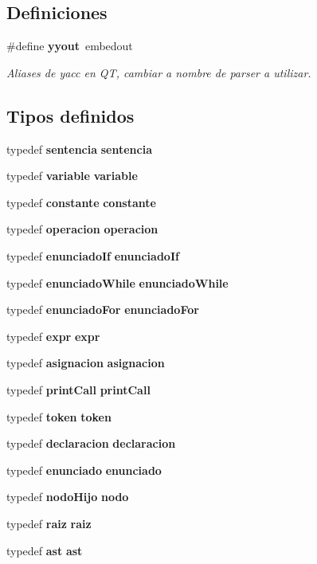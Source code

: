 \subsection*{Definiciones}
\begin{CompactItemize}
\item 
\#define {\bf yyout}~embedout
\begin{CompactList}\small\item\em Aliases de yacc en QT, cambiar a nombre de parser a utilizar. \item\end{CompactList}\end{CompactItemize}
\subsection*{Tipos definidos}
\begin{CompactItemize}
\item 
typedef {\bf sentencia} {\bf sentencia}
\item 
typedef {\bf variable} {\bf variable}
\item 
typedef {\bf constante} {\bf constante}
\item 
typedef {\bf operacion} {\bf operacion}
\item 
typedef {\bf enunciado\-If} {\bf enunciado\-If}
\item 
typedef {\bf enunciado\-While} {\bf enunciado\-While}
\item 
typedef {\bf enunciado\-For} {\bf enunciado\-For}
\item 
typedef {\bf expr} {\bf expr}
\item 
typedef {\bf asignacion} {\bf asignacion}
\item 
typedef {\bf print\-Call} {\bf print\-Call}
\item 
typedef {\bf token} {\bf token}
\item 
typedef {\bf declaracion} {\bf declaracion}
\item 
typedef {\bf enunciado} {\bf enunciado}
\item 
typedef {\bf nodo\-Hijo} {\bf nodo}
\item 
typedef {\bf raiz} {\bf raiz}
\item 
typedef {\bf ast} {\bf ast}
\end{CompactItemize}
